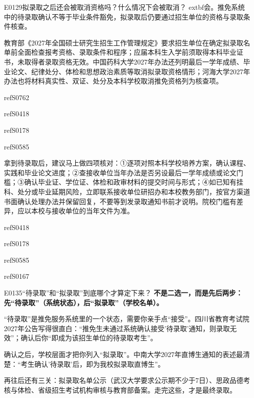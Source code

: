 \begin{qa}{E0129}{拟录取之后还会被取消资格吗？什么情况下会被取消？}
	extbf{会。推免系统中的待录取确认不等于毕业条件豁免，拟录取后仍要通过招生单位的资格与录取条件核查。}

教育部《2027年全国硕士研究生招生工作管理规定》要求招生单位在确定拟录取名单前全面检查报考资格、录取条件和程序；应届本科生入学前须取得本科毕业证书，未取得者录取资格无效。中国药科大学2027年办法还列明最后一学年成绩、毕业论文、纪律处分、体检和思想政治素质等取消拟录取资格情形；河海大学2027年办法也将材料真实性、双证、处分及本科学校取消推免资格列为核查项。

ref{S0762}

ref{S0418}

ref{S0178}

ref{S0585}

拿到待录取后，建议马上做四项核对：①逐项对照本科学校培养方案，确认课程、实践和毕业论文进度；②查接收单位当年办法是否另设最后一学年成绩或论文门槛；③确认毕业证、学位证、体检和政审材料的提交时间与形式；④如已知有挂科、处分或毕业延期风险，立即联系接收单位研招办和本校教务部门，按官方渠道书面确认处理办法并保留回复，不要等到发录取通知书前才说明。院校门槛有差异，应以本校与接收单位的当年文件为准。

ref{S0418}

ref{S0178}

ref{S0585}

ref{S0167}
\end{qa}

\begin{qa}{E0135}{“待录取”和“拟录取”到底哪个才算定下来？}
\textbf{不是二选一，而是先后两步：先“待录取”（系统状态），后“拟录取”（学校名单）。}

“待录取”是推免服务系统里的一个状态，需要你亲手点“接受”。四川省教育考试院2027年公告写得很直白：“推免生未通过系统确认接受'待录取'通知，则录取无效”；确认后你“即成为该招生单位的待录取考生”。

确认之后，学校层面才把你列入“拟录取”。中南大学2027年直博生通知的表述最清楚：“考生确认'待录取'后，即为我校拟录取直博生”。

再往后还有三关：拟录取名单公示（武汉大学要求公示期不少于7日）、思政品德考核与体检、省级招生考试机构审核与教育部备案。走完这些，才是最终录取。
\end{qa}

